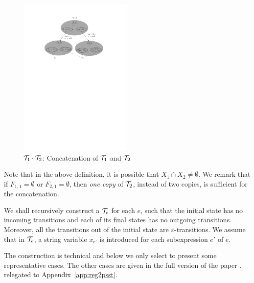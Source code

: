\begin{definition}
\begin{figure}[tb]
			\vspace{-2mm}
			\centering
			\includegraphics[width = 0.5\textwidth]{psstconcat.pdf}
			\caption{$\mathcal{T}_1\cdot \mathcal{T}_2$: Concatenation of $\mathcal{T}_1$ and $\mathcal{T}_2$}
			\label{fig-psstconcat}
			\vspace{-4mm}
		\end{figure}  
\end{definition}
Note that in the above definition, it is possible that $X_1 \cap X_2 \neq \emptyset$. We remark that if $F_{1,1} = \emptyset$ or $F_{2,1} = \emptyset$, then \emph{one copy} of $\mathcal{T}_2$, instead of two copies, is sufficient for the concatenation.

We shall recursively construct a {\PSST} $\mathcal{T}_e$ for each {\pcre} $e$, such that the initial state has no incoming transitions and each of its final states has no outgoing transitions. Moreover, all the transitions out of the initial state are $\varepsilon$-transitions. 
%
We assume that in $\mathcal{T}_e$, a string variable $x_{e'}$ is introduced for each subexpression $e'$ of $e$. 

The construction is technical and below we only select to present some representative cases. The other cases are
%
\ifproceeding given in the full version of the paper \cite{popl22-full}. 
\else relegated to Appendix~\ref{app:reg2psst}. 
\fi

